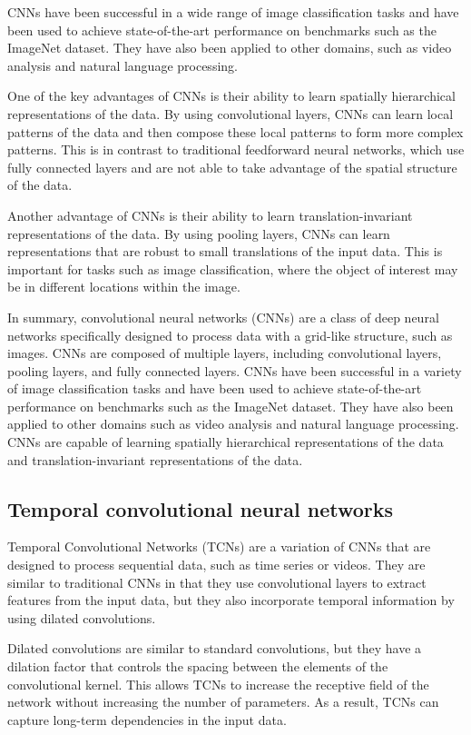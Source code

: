 CNNs have been successful in a wide range of image classification tasks and have been used to achieve state-of-the-art performance on benchmarks such as the ImageNet dataset.
They have also been applied to other domains, such as video analysis and natural language processing.

One of the key advantages of CNNs is their ability to learn spatially hierarchical representations of the data.
By using convolutional layers, CNNs can learn local patterns of the data and then compose these local patterns to form more complex patterns.
This is in contrast to traditional feedforward neural networks, which use fully connected layers and are not able to take advantage of the spatial structure of the data.

Another advantage of CNNs is their ability to learn translation-invariant representations of the data.
By using pooling layers, CNNs can learn representations that are robust to small translations of the input data.
This is important for tasks such as image classification, where the object of interest may be in different locations within the image.

In summary, convolutional neural networks (CNNs) are a class of deep neural networks specifically designed to process data with a grid-like structure, such as images.
CNNs are composed of multiple layers, including convolutional layers, pooling layers, and fully connected layers.
CNNs have been successful in a variety of image classification tasks and have been used to achieve state-of-the-art performance on benchmarks such as the ImageNet dataset.
They have also been applied to other domains such as video analysis and natural language processing.
CNNs are capable of learning spatially hierarchical representations of the data and translation-invariant representations of the data.

\subsection{Temporal convolutional neural networks}

Temporal Convolutional Networks (TCNs) are a variation of CNNs that are designed to process sequential data, such as time series or videos.
They are similar to traditional CNNs in that they use convolutional layers to extract features from the input data, but they also incorporate temporal information by using dilated convolutions.

Dilated convolutions are similar to standard convolutions, but they have a dilation factor that controls the spacing between the elements of the convolutional kernel.
This allows TCNs to increase the receptive field of the network without increasing the number of parameters.
As a result, TCNs can capture long-term dependencies in the input data.

